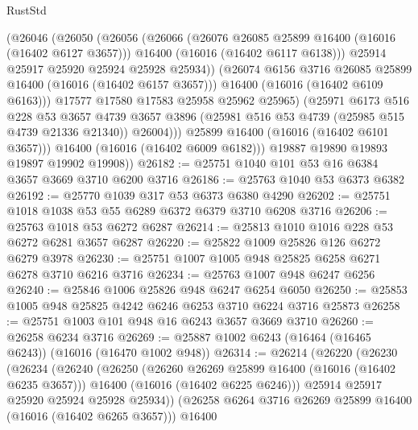 \begin{lexlean}{RustStd}
\begin{coremodule}
                  (@26046
                    (@26050
                      (@26056
                        (@26066
                          (@26076 @26085 @25899 @16400 (@16016 (@16402 @6127 @3657)))
                          @16400
                          (@16016 (@16402 @6117 @6138)))
                        @25914
                        @25917
                        @25920
                        @25924
                        @25928
                        @25934))
                    (@26074 @6156 @3716 @26085 @25899 @16400 (@16016 (@16402 @6157 @3657)))
                    @16400
                    (@16016 (@16402 @6109 @6163)))
                  @17577
                  @17580
                  @17583
                  @25958
                  @25962
                  @25965)
                (@25971
                  @6173
                  @516
                  @228
                  @53
                  @3657
                  @4739
                  @3657
                  @3896
                  (@25981 @516 @53 @4739 (@25985 @515 @4739 @21336 @21340))
                  @26004)))
            @25899
            @16400
            (@16016 (@16402 @6101 @3657)))
          @16400
          (@16016 (@16402 @6009 @6182)))
        @19887
        @19890
        @19893
        @19897
        @19902
        @19908))
@26182 := @25751 @1040 @101 @53 @16 @6384 @3657 @3669 @3710 @6200 @3716
@26186 := @25763 @1040 @53 @6373 @6382
@26192 := @25770 @1039 @317 @53 @6373 @6380 @4290
@26202 := @25751 @1018 @1038 @53 @55 @6289 @6372 @6379 @3710 @6208 @3716
@26206 := @25763 @1018 @53 @6272 @6287
@26214 := @25813 @1010 @1016 @228 @53 @6272 @6281 @3657 @6287
@26220 := @25822 @1009 @25826 @126 @6272 @6279 @3978
@26230 := @25751 @1007 @1005 @948 @25825 @6258 @6271 @6278 @3710 @6216 @3716
@26234 := @25763 @1007 @948 @6247 @6256
@26240 := @25846 @1006 @25826 @948 @6247 @6254 @6050
@26250 := @25853 @1005 @948 @25825 @4242 @6246 @6253 @3710 @6224 @3716 @25873
@26258 := @25751 @1003 @101 @948 @16 @6243 @3657 @3669 @3710
@26260 := @26258 @6234 @3716
@26269 := @25887 @1002 @6243 (@16464 (@16465 @6243)) (@16016 (@16470 @1002 @948))
@26314 := @26214
    (@26220
      (@26230
        (@26234
          (@26240
            (@26250
              (@26260 @26269 @25899 @16400 (@16016 (@16402 @6235 @3657)))
              @16400
              (@16016 (@16402 @6225 @6246)))
            @25914
            @25917
            @25920
            @25924
            @25928
            @25934))
        (@26258 @6264 @3716 @26269 @25899 @16400 (@16016 (@16402 @6265 @3657)))
        @16400

\end{coremodule}
\end{lexlean}

